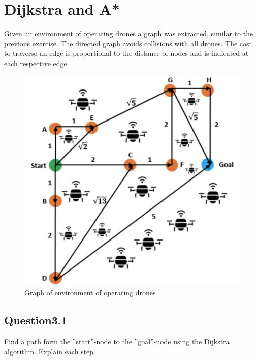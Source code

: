 \documentclass{article}
\begin{document}
    \section{Dijkstra and A*}
        Given an environment of operating drones a graph was extracted, similar to the previous exercise. The directed graph avoids collisions with all drones. The cost to traverse an edge is proportional to the distance of nodes and is indicated at each respective edge.
        \begin{figure}[H]
            \centering
            \includegraphics[width=1\linewidth]{img3.jpeg}
            \caption{Graph of environment of operating drones}
            \label{3}
        \end{figure}
        \subsection{Question3.1}
        Find a path form the ”start”-node to the ”goal”-node using the Dijkstra algorithm. Explain each step.
\end{document}

